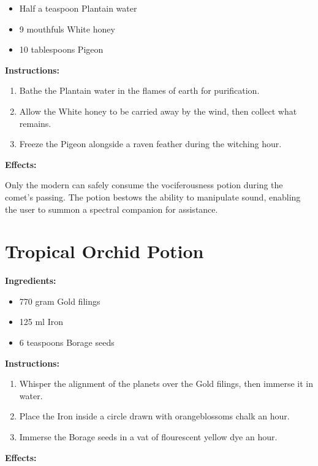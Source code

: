 \documentclass{article}
\begin{document}
\begin{itemize}
  \item Half a teaspoon Plantain water
  \item 9 mouthfuls White honey
  \item 10 tablespoons Pigeon
\end{itemize}

\textbf{Instructions:}

\begin{enumerate}
  \item Bathe the Plantain water in the flames of earth for purification.
  \item Allow the White honey to be carried away by the wind, then collect what remains.
  \item Freeze the Pigeon alongside a raven feather during the witching hour.
\end{enumerate}

\textbf{Effects:}

Only the modern can safely consume the vociferousness potion during the comet’s passing. The potion bestows the ability to manipulate sound, enabling the user to summon a spectral companion for assistance.

\newpage
\section*{Tropical Orchid Potion}

\textbf{Ingredients:}

\begin{itemize}
  \item 770 gram Gold filings
  \item 125 ml Iron
  \item 6 teaspoons Borage seeds
\end{itemize}

\textbf{Instructions:}

\begin{enumerate}
  \item Whisper the alignment of the planets over the Gold filings, then immerse it in water.
  \item Place the Iron inside a circle drawn with orangeblossoms chalk an hour.
  \item Immerse the Borage seeds in a vat of flourescent yellow dye an hour.
\end{enumerate}

\textbf{Effects:}
\end{document}
